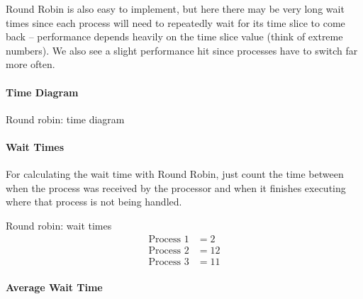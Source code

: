 Round Robin is also easy to implement, but here there may be very long wait times since each process will need to repeatedly wait for its time slice to come back -- performance depends heavily on the time slice value (think of extreme numbers).
We also see a slight performance hit since processes have to switch far more often.

\paragraph{Time Diagram}\label{par:time_diagram_3}

\begin{highlight}{Round robin: time diagram}
\end{highlight}

\paragraph{Wait Times}\label{par:wait_times_2}

For calculating the wait time with Round Robin, just count the time between when the process was received by the processor and when it finishes executing where that process is not being handled.
\begin{highlight}{Round robin: wait times}
    \begin{align*}
        \text{Process \(1\)} & = 2  \\
        \text{Process \(2\)} & = 12 \\
        \text{Process \(3\)} & = 11
    \end{align*}
\end{highlight}

\paragraph{Average Wait Time}\label{par:average_wait_time_2}

